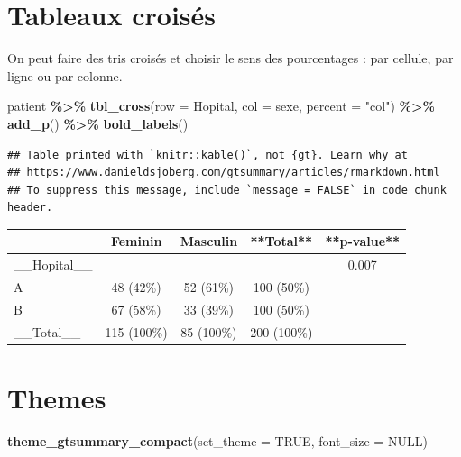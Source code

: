 \documentclass[
]{book}
\newenvironment{Shaded}{\begin{snugshade}}{\end{snugshade}}
\newcommand{\AttributeTok}[1]{\textcolor[rgb]{0.13,0.29,0.53}{#1}}
\newcommand{\ConstantTok}[1]{\textcolor[rgb]{0.56,0.35,0.01}{#1}}
\newcommand{\FunctionTok}[1]{\textcolor[rgb]{0.13,0.29,0.53}{\textbf{#1}}}
\newcommand{\NormalTok}[1]{#1}
\newcommand{\SpecialCharTok}[1]{\textcolor[rgb]{0.81,0.36,0.00}{\textbf{#1}}}
\newcommand{\StringTok}[1]{\textcolor[rgb]{0.31,0.60,0.02}{#1}}
\begin{document}
\hypertarget{tableaux-croisuxe9s}{%
\section{Tableaux croisés}\label{tableaux-croisuxe9s}}

On peut faire des tris croisés et choisir le sens des pourcentages : par cellule,
par ligne ou par colonne.

\begin{Shaded}
\begin{Highlighting}[]
\NormalTok{patient }\SpecialCharTok{\%\textgreater{}\%}
  \FunctionTok{tbl\_cross}\NormalTok{(}\AttributeTok{row =}\NormalTok{ Hopital, }\AttributeTok{col =}\NormalTok{ sexe, }\AttributeTok{percent =} \StringTok{"col"}\NormalTok{) }\SpecialCharTok{\%\textgreater{}\%}
  \FunctionTok{add\_p}\NormalTok{() }\SpecialCharTok{\%\textgreater{}\%}
  \FunctionTok{bold\_labels}\NormalTok{()}
\end{Highlighting}
\end{Shaded}

\begin{verbatim}
## Table printed with `knitr::kable()`, not {gt}. Learn why at
## https://www.danieldsjoberg.com/gtsummary/articles/rmarkdown.html
## To suppress this message, include `message = FALSE` in code chunk header.
\end{verbatim}

\begin{tabular}{l|c|c|c|c}
\hline
 & Feminin & Masculin & **Total** & **p-value**\\
\hline
\_\_Hopital\_\_ &  &  &  & 0.007\\
\hline
A & 48 (42\%) & 52 (61\%) & 100 (50\%) & \\
\hline
B & 67 (58\%) & 33 (39\%) & 100 (50\%) & \\
\hline
\_\_Total\_\_ & 115 (100\%) & 85 (100\%) & 200 (100\%) & \\
\hline
\end{tabular}

\hypertarget{themes}{%
\section{Themes}\label{themes}}

\begin{Shaded}
\begin{Highlighting}[]
\FunctionTok{theme\_gtsummary\_compact}\NormalTok{(}\AttributeTok{set\_theme =} \ConstantTok{TRUE}\NormalTok{, }\AttributeTok{font\_size =} \ConstantTok{NULL}\NormalTok{)}
\end{Highlighting}
\end{Shaded}
\end{document}
